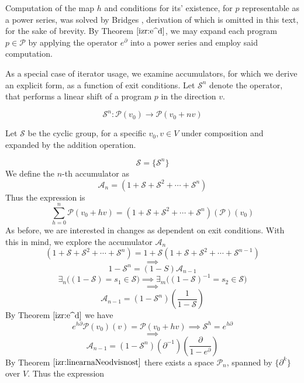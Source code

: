 \documentclass{article}
\newcommand{\Shift}{\mathcal{S}}
\newcommand{\dP}{\mathcal{P}}
\newcommand{\D}{\partial}
\begin{document}
  Computation of the map $h$ and conditions for its' existence, for $p$ representable as a power series, was solved by Bridges \cite{BridgesShroeder}, derivation of which is omitted in this text, for the sake of brevity. By Theorem $\ref{izr:e^d}$, we may expand each program $p\in\dP$ by applying the operator $e^\D$ into a power series and employ said computation.
  
  As a special case of iterator usage, we examine accumulators, for which we derive an explicit form, as a function of exit conditions. Let $\Shift^n$ denote the operator, that performs a linear shift of a program $p$ in the direction $v$.
   
   \begin{equation}
   \Shift^n:\dP(v_0)\to \dP(v_0+nv)
   \end{equation}
    
    Let $\Shift$ be the cyclic group, for a specific $v_0, v\in V$ under composition and expanded by the addition operation.
    
   $$\Shift=\{\Shift^n\}$$   
   We define the $n$-th accumulator as 
   $$\mathcal{A}_n=(1+\Shift+\Shift^2+\cdots+\Shift^n)$$ Thus the expression is
   $$\sum\limits_{h=0}^{n}\dP(v_0+hv)=(1+\Shift+\Shift^2+\cdots+\Shift^n)(\dP)(v_0)$$
   As before, we are interested in changes as dependent on exit conditions. With this in mind, we explore the accumulator $\mathcal{A}_n$
   $$(1+\Shift+\Shift^2+\cdots+\Shift^n)=1+\Shift(1+\Shift+\Shift^2+\cdots+\Shift^{n-1})$$
   $$\implies$$
   $$1-\Shift^n=(1-S)\mathcal{A}_{n-1}$$
   $$\exists_n\Big((1-\Shift)=s_1\in\Shift\Big)\implies \exists_m\Big((1-\Shift)^{-1}=s_2\in \Shift\Big)$$
   $$\implies$$
   $$\mathcal{A}_{n-1}=(1-\Shift^n)(\frac{1}{1-\Shift})$$
   By Theorem $\ref{izr:e^d}$ we have
   $$e^{h\D}\dP(v_0)(v)=\dP(v_0+hv)\implies \Shift^h=e^{h\D}$$
   $$\implies$$
   $$\mathcal{A}_{n-1}=(1-\Shift^n)(\D^{-1})(\frac{\D}{1-e^{\D}})$$
   By Theorem $\ref{izr:linearnaNeodvisnost}$  there exists a space $\dP_n$, spanned by $\{\D^k\}$ over $V$. Thus the expression   
     
\end{document}
